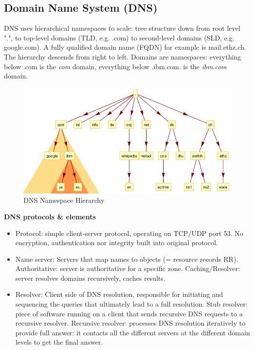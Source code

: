 \documentclass[11pt,oneside,a4paper]{article}
\begin{document}
\subsection{Domain Name System (DNS)}

DNS uses hierarchical namespaces to scale: tree structure down from root level ".", to top-level domains (TLD, e.g. .com) to second-level domains (SLD, e.g. google.com). A fully qualified domain name (FQDN) for example is mail.ethz.ch. The hierarchy descends from right to left. Domains are namespaces: everything below .com is the \textit{com} domain, everything below .ibm.com. is the \textit{ibm.com} domain.

\begin{figure}[hb]
	\centering
	\includegraphics[width=0.6\linewidth]{figures/dns_namespace_hierarchy}
	\caption{DNS Namespace Hierarchy}
	\label{fig:dnsnamespacehierarchy}
\end{figure}

\textbf{DNS protocols \& elements}

\vspace{-\topsep}
\begin{itemize}
	\setlength{\itemsep}{0pt}
	\setlength{\parskip}{0pt}
	\item Protocol: simple client-server protocol, operating on TCP/UDP port 53. No encryption, authentication nor integrity built into original protocol.
	\item Name server: Servers that map names to objects (= resource records RR). Authoritative: server is authoritative for a specific zone. Caching/Resolver: server resolves domains recursively, caches	results.
	\item Resolver: Client side of DNS resolution, responsible for initiating and sequencing the queries that ultimately lead to a full resolution. Stub resolver: piece of software running on a client that sends recursive DNS requests to a recursive resolver. Recursive resolver: processes DNS resolution iteratively to	provide full answer: it contacts all the different servers at the different domain levels to get the final answer.
\end{itemize}
\vspace{-\topsep}
\end{document}
